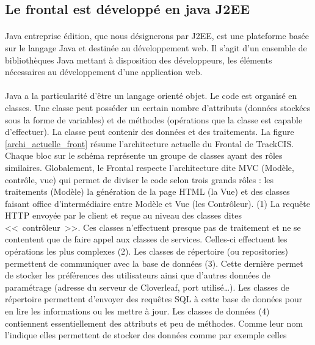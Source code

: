 		\subsection{Le frontal est développé en java J2EE}
			\paragraph{}%
			Java entreprise édition, que nous désignerons par J2EE, est une
			plateforme basée sur le langage Java et destinée au développement web. Il
			s'agit d'un ensemble de bibliothèques Java mettant à disposition des
			développeurs, les éléments nécessaires au développement d'une application
			web.
			
			\paragraph{}
			Java a la particularité d'être un langage orienté objet. Le code est organisé
			en classes. Une classe peut posséder un certain nombre d'attributs
			(données stockées sous la forme de variables) et de méthodes (opérations
			que la classe est capable d'effectuer). La classe peut contenir des données
			et des traitements. La figure \ref{archi_actuelle_front} résume
			l'architecture actuelle du Frontal de TrackCIS. Chaque bloc sur le schéma représente un
			groupe de classes ayant des rôles similaires. Globalement, le Frontal
			respecte l'architecture dite MVC (Modèle, contrôle, vue) qui permet de
			diviser le code selon trois grands rôles : les traitements (Modèle) la
			génération de la page HTML (la Vue) et des classes faisant office
			d'intermédiaire entre Modèle et Vue (les Contrôleur). (1) La requête HTTP
			envoyée par le client et reçue au niveau des classes dites <<~contrôleur~>>.
			Ces classes n'effectuent presque pas de traitement et ne se contentent que de
			faire appel aux classes de services.
			Celles-ci effectuent les opérations les plus complexes (2). Les classes de
			répertoire (ou repositories) permettent de communiquer avec la base de
			données (3).
			Cette dernière permet de stocker les préférences des utilisateurs ainsi que
			d'autres données de paramétrage (adresse du serveur de
			Cloverleaf, port utilisé\ldots). Les classes de répertoire permettent
			d'envoyer des requêtes SQL à cette base de données pour en lire les
			informations ou les mettre à jour. Les classes de données (4) contiennent
			essentiellement des attributs et peu de méthodes. Comme leur nom
			l'indique elles permettent de stocker des données comme par exemple celles
